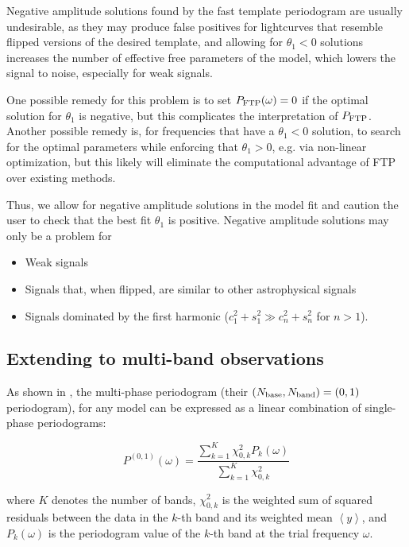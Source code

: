 \documentclass[apj]{emulateapj}
\newcommand{\savg}[1]{\left<#1\right>}
\begin{document}
Negative amplitude solutions found by the fast template periodogram are usually
undesirable, as they may produce false positives for lightcurves that resemble
flipped versions of the desired template, and allowing for $\theta_1 < 0$ solutions
increases the number of effective free parameters of the model, which lowers
the signal to noise, especially for weak signals.

One possible remedy for this problem is to set $P_{\rm FTP}(\omega) = 0$ if the optimal
solution for $\theta_1$ is negative, but this complicates the interpretation of $P_{\rm FTP}$.
Another possible remedy is, for frequencies that have a $\theta_1 < 0$ solution, 
to search for the optimal parameters while enforcing that $\theta_1 > 0$,
e.g. via non-linear optimization, but this likely will eliminate the computational
advantage of FTP over existing methods.

Thus, we allow for negative amplitude solutions in the model fit and caution
the user to check that the best fit $\theta_1$ is positive. Negative amplitude
solutions may only be a problem for 

\begin{itemize}
\item Weak signals
\item Signals that, when flipped, are similar to other astrophysical signals
\item Signals dominated by the first harmonic ($c_1^2 + s_1^2 \gg c_n^2 + s_n^2$ for $n > 1$).
\end{itemize}


\subsection{Extending to multi-band observations}
\label{sec:multiband}
As shown in \cite{Vanderplas+Ivezic_2015}, the multi-phase periodogram (their 
$(N_{\rm base}, N_{\rm band}) = (0, 1)$ periodogram), for any model can
be expressed as a linear combination of single-phase periodograms:

\begin{equation}
\label{eq:multiband}
P^{(0,1)}(\omega) = \frac{\sum_{k=1}^K\chi^2_{0, k}P_{k}(\omega)}{\sum_{k=1}^K\chi^2_{0,k}}
\end{equation} 

\noindent where $K$ denotes the number of bands, $\chi^2_{0,k}$ is the weighted sum of squared
residuals between the data in the $k$-th band and its weighted mean $\savg{y}$, and $P_k(\omega)$ is
the periodogram value of the $k$-th band at the trial frequency $\omega$. 
\end{document}

